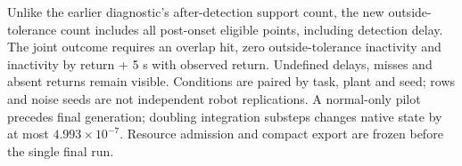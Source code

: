 Unlike the earlier diagnostic's after-detection support count, the new outside-tolerance count includes all post-onset eligible points, including detection delay. The joint outcome requires an overlap hit, zero outside-tolerance inactivity and inactivity by return + 5 s with observed return. Undefined delays, misses and absent returns remain visible. Conditions are paired by task, plant and seed; rows and noise seeds are not independent robot replications. A normal-only pilot precedes final generation; doubling integration substeps changes native state by at most $4.993\times10^{-7}$. Resource admission and compact export are frozen before the single final run.

